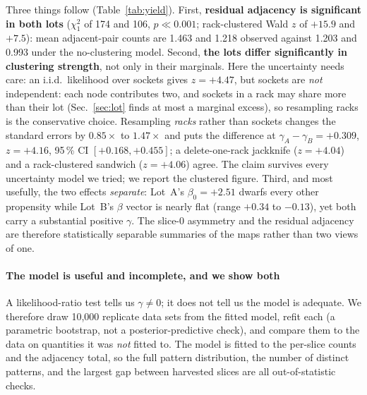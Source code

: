 \documentclass[10pt,conference]{IEEEtran}
\begin{document}
Three things follow (Table~\ref{tab:yield}). First, \textbf{residual adjacency is significant in
both lots} ($\chi^2_1$ of
174 and 106, $p\ll0.001$; rack-clustered Wald $z$ of $+15.9$ and $+7.5$): mean adjacent-pair counts are 1.463 and 1.218 observed against 1.203 and 0.993 under
the no-clustering model. Second, \textbf{the lots differ significantly in clustering strength}, not only in their
marginals. Here the uncertainty needs care: an i.i.d.\ likelihood over sockets gives
$z=+4.47$, but sockets are \emph{not} independent: each node contributes two, and sockets in a
rack may share more than their lot (Sec.~\ref{sec:lot} finds at most a marginal excess), so
resampling racks is the conservative choice. Resampling \emph{racks} rather than sockets changes
the standard errors by $0.85\times$ to $1.47\times$ and puts the difference at
$\gamma_A-\gamma_B = +0.309$, $z=+4.16$, 95\,\% CI $[+0.168,+0.455]$; a delete-one-rack jackknife
($z=+4.04$) and a rack-clustered sandwich ($z=+4.06$) agree. The claim survives every uncertainty
model we tried; we report the clustered figure. Third, and most usefully, the two effects
\emph{separate}: Lot~A's $\beta_0=+2.51$ dwarfs every other propensity while Lot~B's $\beta$ vector
is nearly flat (range $+0.34$ to $-0.13$), yet both carry a substantial positive $\gamma$. The
slice-0 asymmetry and the residual adjacency are therefore statistically separable summaries of
the maps rather than two views of one.

\paragraph*{The model is useful and incomplete, and we show both}
\label{par:ppc}
A likelihood-ratio test tells us $\gamma\ne0$; it does not tell us the model is adequate. We
therefore draw 10{,}000 replicate data sets from the fitted model, refit each (a parametric
bootstrap, not a posterior-predictive check), and compare them to the data on quantities it was
\emph{not} fitted to. The model is fitted to the per-slice counts and the adjacency total, so
the full pattern distribution, the number of distinct patterns, and the largest gap between
harvested slices are all out-of-statistic checks.
\end{document}
